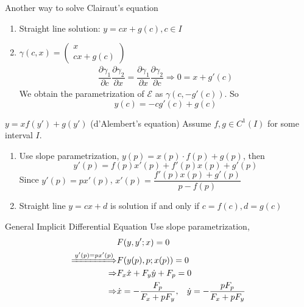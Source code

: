 \documentclass{beamer}
\begin{document}
\begin{frame}
\begin{block}{Another way to solve Clairaut's equation}
\begin{enumerate}
\item Straight line solution: $y=cx+g(c),c\in I$
\item $\gamma(c,x)=\begin{pmatrix}
x\\
cx+g(c)
\end{pmatrix}$
\begin{align*}
\dfrac{\partial \gamma_1}{\partial c}\dfrac{\partial \gamma_2}{\partial x}=\dfrac{\partial \gamma_1}{\partial x}\dfrac{\partial \gamma_2}{\partial c}
\Rightarrow 0=x+g'(c)
\end{align*}
We obtain the parametrization of $\mathcal{E}$ as $\gamma(c,-g'(c))$. So 
$$y(c)=-cg'(c)+g(c)$$
\end{enumerate}

\end{block}
\end{frame}

\begin{frame}
\begin{block}{$y=xf(y')+g(y')$ (d'Alembert's equation)}
Assume $f,g\in C^1(I)$ for some interval $I$. 
\begin{enumerate}
\item Use slope parametrization, $y(p)=x(p)\cdot f(p)+g(p)$, then
$$y'(p)=f(p)x'(p)+f'(p)x(p)+g'(p)$$
Since $y'(p)=px'(p)$, $x'(p)=\dfrac{f'(p)x(p)+g'(p)}{p-f(p)}$
\item Straight line $y=cx+d$ is solution if and only if $c=f(c),d=g(c)$
\end{enumerate} 
\end{block}
\end{frame}

\begin{frame}
\begin{block}{General Implicit Differential Equation}
Use slope parametrization,
\begin{align*}
&F(y,y';x)=0\\
\xLongrightarrow{y'(p)=px'(p)}&F(y(p),p;x(p))=0\\
\Rightarrow& F_x\dot{x}+F_y\dot{y}+F_p=0\\
\Rightarrow&\dot{x}=-\dfrac{F_p}{F_x+pF_y},\hspace{3mm}\dot{y}=-\dfrac{pF_p}{F_x+pF_y}
\end{align*}
\end{block}
\end{frame}
\end{document}
